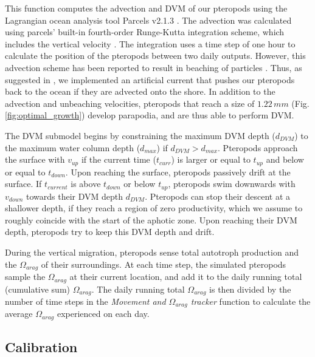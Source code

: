 This function computes the advection and DVM of our pteropods using the Lagrangian ocean analysis tool Parcels v2.1.3 \citep{Delandmeter2019Unbeaching}. The advection was calculated using parcels' built-in fourth-order Runge-Kutta integration scheme, which includes the vertical velocity \citep{Delandmeter2019Unbeaching}. The integration uses a time step of one hour to calculate the position of the pteropods between two daily outputs. However, this advection scheme has been reported to result in beaching of particles \citep{Delandmeter2019Unbeaching}. Thus, as suggested in \cite{Delandmeter2019Unbeaching}, we implemented an artificial current that pushes our pteropods back to the ocean if they are advected onto the shore. In addition to the advection and unbeaching velocities, pteropods that reach a size of $1.22\,mm$ (Fig. \ref{fig:optimal_growth}) develop parapodia, and are thus able to perform DVM.

The DVM submodel begins by constraining the maximum DVM depth ($d_{DVM}$) to the maximum water column depth ($d_{max}$) if $d_{DVM}>d_{max}$. Pteropods approach the surface with $v_{up}$ if the current time ($t_{curr}$) is larger or equal to $t_{up}$ and below or equal to $t_{down}$. Upon reaching the surface, pteropods passively drift at the surface. If $t_{current}$ is above $t_{down}$ or below $t_{up}$, pteropods swim downwards with $v_{down}$ towards their DVM depth $d_{DVM}$. Pteropods can stop their descent at a shallower depth, if they reach a region of zero productivity, which we assume to roughly coincide with the start of the aphotic zone. Upon reaching their DVM depth, pteropods try to keep this DVM depth and drift.

During the vertical migration, pteropods sense total autotroph production and the $\Omega_{arag}$ of their surroundings. At each time step, the simulated pteropods sample the $\Omega_{arag}$ at their current location, and add it to the daily running total (cumulative sum) $\Omega_{arag}$. The daily running total $\Omega_{arag}$ is then divided by the number of time steps in the \textit{Movement and $\Omega_{arag}$ tracker} function to calculate the average $\Omega_{arag}$ experienced on each day.









\subsection{Calibration}

